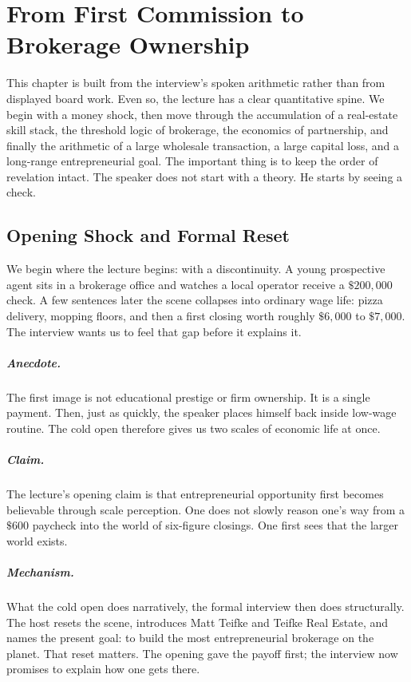 \chapter{From First Commission to Brokerage Ownership}

This chapter is built from the interview's spoken arithmetic rather than from displayed board work. Even so, the lecture has a clear quantitative spine. We begin with a money shock, then move through the accumulation of a real-estate skill stack, the threshold logic of brokerage, the economics of partnership, and finally the arithmetic of a large wholesale transaction, a large capital loss, and a long-range entrepreneurial goal. The important thing is to keep the order of revelation intact. The speaker does not start with a theory. He starts by seeing a check.

\section{Opening Shock and Formal Reset}

We begin where the lecture begins: with a discontinuity. A young prospective agent sits in a brokerage office and watches a local operator receive a \(\$200{,}000\) check. A few sentences later the scene collapses into ordinary wage life: pizza delivery, mopping floors, and then a first closing worth roughly \(\$6{,}000\) to \(\$7{,}000\). The interview wants us to feel that gap before it explains it.

\paragraph{Anecdote.}
The first image is not educational prestige or firm ownership. It is a single payment. Then, just as quickly, the speaker places himself back inside low-wage routine. The cold open therefore gives us two scales of economic life at once.

\paragraph{Claim.}
The lecture's opening claim is that entrepreneurial opportunity first becomes believable through scale perception. One does not slowly reason one's way from a \(\$600\) paycheck into the world of six-figure closings. One first sees that the larger world exists.

\paragraph{Mechanism.}
What the cold open does narratively, the formal interview then does structurally. The host resets the scene, introduces Matt Teifke and Teifke Real Estate, and names the present goal: to build the most entrepreneurial brokerage on the planet. That reset matters. The opening gave the payoff first; the interview now promises to explain how one gets there.

